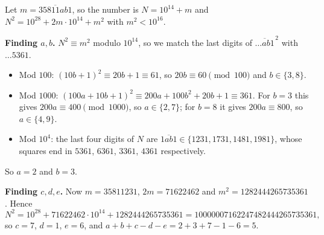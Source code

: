 Let $m=\overline{35811ab1}$, so the number is $N=10^{14}+m$ and $N^2=10^{28}+2m\cdot10^{14}+m^2$ with $m^2<10^{16}$.

\textbf{Finding $a,b$.} $N^2\equiv m^2$ modulo $10^{14}$, so we match the last digits of $\overline{\dots ab1}^{\,2}$ with $\dots5361$.
\begin{itemize}
\item Mod $100$: $(10b+1)^2\equiv20b+1\equiv61$, so $20b\equiv60\pmod{100}$ and $b\in\{3,8\}$.
\item Mod $1000$: $(100a+10b+1)^2\equiv200a+100b^2+20b+1\equiv361$. For $b=3$ this gives $200a\equiv400\pmod{1000}$, so $a\in\{2,7\}$; for $b=8$ it gives $200a\equiv800$, so $a\in\{4,9\}$.
\item Mod $10^4$: the last four digits of $N$ are $\overline{1ab1}\in\{1231,1731,1481,1981\}$, whose squares end in $5361$, $6361$, $3361$, $4361$ respectively.
\end{itemize}
So $a=2$ and $b=3$.

\textbf{Finding $c,d,e$.} Now $m=35811231$, $2m=71622462$ and $m^2=1282444265735361$. Hence
\[N^2=10^{28}+71622462\cdot10^{14}+1282444265735361=10000007162247482444265735361,\]
so $c=7$, $d=1$, $e=6$, and $a+b+c-d-e=2+3+7-1-6=\boxed{5}$.
